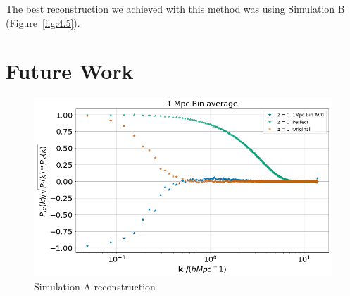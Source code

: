 The best reconstruction we achieved with this method was using Simulation B (Figure~\ref{fig:4.5}).



\section{Future Work}


\begin{figure}
    \centering
    \includegraphics[width=1\columnwidth]{images/realRecon/1MpcBinAvg.png}%
    
    \caption{
        Simulation A reconstruction
    }
    
    \label{fig:12}
\end{figure}

